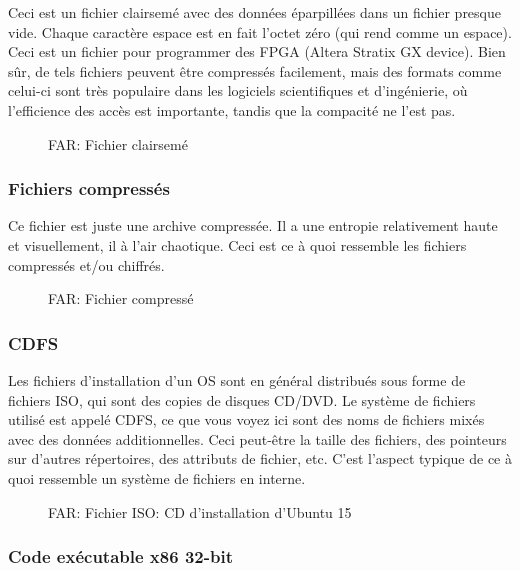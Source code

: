 Ceci est un fichier clairsemé avec des données éparpillées dans un fichier presque vide.
Chaque caractère espace est en fait l'octet zéro (qui rend comme un espace).
Ceci est un fichier pour programmer des FPGA (Altera Stratix GX device).
Bien sûr, de tels fichiers peuvent être compressés facilement, mais des formats comme
celui-ci sont très populaire dans les logiciels scientifiques et d'ingénierie, où
l'efficience des accès est importante, tandis que la compacité ne l'est pas.

\begin{figure}[H]
\centering
{}
\caption{FAR: Fichier clairsemé}
\end{figure}

\clearpage
\subsubsection{Fichiers compressés}

Ce fichier est juste une archive compressée.
Il a une entropie relativement haute et visuellement, il à l'air chaotique.
Ceci est ce à quoi ressemble les fichiers compressés et/ou chiffrés.

\begin{figure}[H]
\centering
{}
\caption{FAR: Fichier compressé}
\end{figure}

\clearpage
\subsubsection{\ac{CDFS}}

Les fichiers d'installation d'un \ac{OS} sont en général distribués sous forme de
fichiers ISO, qui sont des copies de disques CD/DVD.
Le système de fichiers utilisé est appelé \ac{CDFS}, ce que vous voyez ici sont des
noms de fichiers mixés avec des données additionnelles.
Ceci peut-être la taille des fichiers, des pointeurs sur d'autres répertoires, des
attributs de fichier, etc.
C'est l'aspect typique de ce à quoi ressemble un système de fichiers en interne.

\begin{figure}[H]
\centering
{}
\caption{FAR: Fichier ISO: \ac{CD} d'installation d'Ubuntu 15}
\end{figure}

\clearpage
\subsubsection{Code exécutable x86 32-bit}

